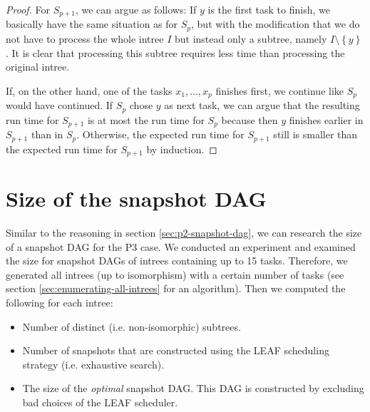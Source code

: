 \begin{proof}


  
  For $S_{p+1}$, we can argue as follows: If $y$ is the first task to finish, we basically have the same situation as for $S_p$, but with the modification that we do not have to process the whole intree $I$ but instead only a subtree, namely $I\setminus\left\{ y \right\}$. It is clear that processing this subtree requires less time than processing the original intree.

  If, on the other hand, one of the tasks $x_1,\dots,x_p$ finishes first, we continue like $S_p$ would have continued. If $S_p$ chose $y$ as next task, we can argue that the resulting run time for $S_{p+1}$ is at most the run time for $S_p$ because then $y$ finishes earlier in $S_{p+1}$ than in $S_p$. Otherwise, the expected run time for $S_{p+1}$ still is smaller than the expected run time for $S_{p+1}$ by induction.
\end{proof}

\section{Size of the snapshot DAG}
\label{sec:p3-size-of-snapshot-dag-first-attempts}

Similar to the reasoning in section \ref{sec:p2-snapshot-dag}, we can research the size of a snapshot DAG for the P3 case. 
We conducted an experiment and examined the size for snapshot DAGs of intrees containing up to 15 tasks. 
Therefore, we generated all intrees (up to isomorphism) with a certain number of tasks (see section \ref{sec:enumerating-all-intrees} for an algorithm).
Then we computed the following for each intree:
\begin{itemize}
\item Number of distinct (i.e. non-isomorphic) subtrees.
\item Number of snapshots that are constructed using the LEAF scheduling strategy (i.e. exhaustive search).
\item The size of the \emph{optimal} snapshot DAG. This DAG is constructed by excluding bad choices of the LEAF scheduler.
\end{itemize}

